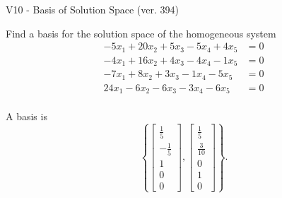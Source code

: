 \begin{exercise}
  \begin{exerciseTitle}V10 - Basis of Solution Space (ver. 394)\end{exerciseTitle}
  \begin{exerciseStatement}
    Find a basis for the solution space of the homogeneous system 
\begin{align*}
 -5 x_ 1 + 20 x_ 2 + 5 x_ 3 -5 x_ 4 + 4 x_ 5 &= 0  \\ 
  -4 x_ 1 + 16 x_ 2 + 4 x_ 3 -4 x_ 4 -1 x_ 5 &= 0  \\ 
  -7 x_ 1 + 8 x_ 2 + 3 x_ 3 -1 x_ 4 -5 x_ 5 &= 0  \\ 
  24 x_ 1 -6 x_ 2 -6 x_ 3 -3 x_ 4 -6 x_ 5 &= 0  \\ 
 \end{align*}


 
  \end{exerciseStatement}

  \begin{exerciseAnswer}
   A basis is   
\[\left\{\left[\begin{array}{c}
\frac{1}{5} \\
-\frac{1}{5} \\
1 \\
0 \\
0
\end{array}\right] , \left[\begin{array}{c}
\frac{1}{5} \\
\frac{3}{10} \\
0 \\
1 \\
0
\end{array}\right]\right\}.\]

  


  \end{exerciseAnswer}
\end{exercise}